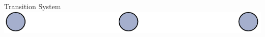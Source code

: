 \begin{frame}{Transition System}
\includegraphics[height=0.85\textheight, width=.95\textwidth, keepaspectratio=true]{img/Koffie_states}
\end{frame}

